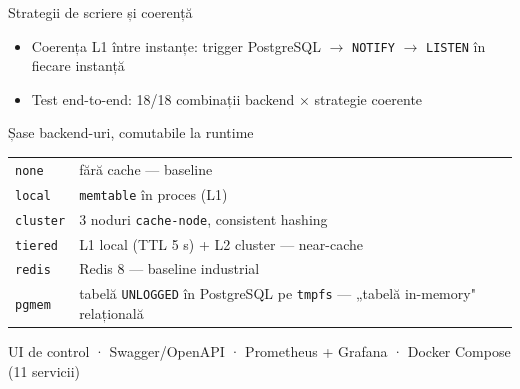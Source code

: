 \documentclass[aspectratio=169,11pt]{beamer}
\begin{document}
\begin{frame}{Strategii de scriere și coerență}
  \centering\resizebox{0.95\linewidth}{!}{}
  \vspace{3mm}
  \begin{itemize}\small
    \item Coerența L1 între instanțe: trigger PostgreSQL $\rightarrow$ \texttt{NOTIFY} $\rightarrow$ \texttt{LISTEN} în fiecare instanță
    \item Test end-to-end: \alert{18/18} combinații backend × strategie coerente
  \end{itemize}
\end{frame}

\begin{frame}{Șase backend-uri, comutabile la runtime}
  \small
  \begin{tabular}{ll}
    \toprule
    \texttt{none} & fără cache — baseline \\
    \texttt{local} & \texttt{memtable} în proces (L1) \\
    \texttt{cluster} & 3 noduri \texttt{cache-node}, consistent hashing \\
    \texttt{tiered} & L1 local (TTL 5 s) + L2 cluster — near-cache \\
    \texttt{redis} & Redis 8 — baseline industrial \\
    \texttt{pgmem} & tabelă \texttt{UNLOGGED} în PostgreSQL pe \texttt{tmpfs} — „tabelă in-memory" relațională \\
    \bottomrule
  \end{tabular}
  \vspace{4mm}

  UI de control · Swagger/OpenAPI · Prometheus + Grafana · Docker Compose (11 servicii)
\end{frame}
\end{document}

